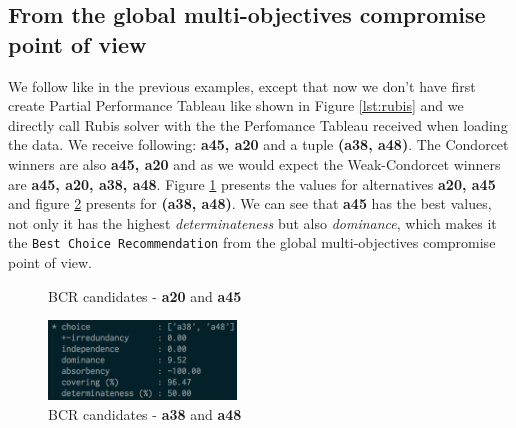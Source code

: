 \documentclass[a4paper]{article}
\begin{document}
\subsection{From the global multi-objectives compromise point of view}
\label{sec:global}

We follow like in the previous examples, except that now we don't have first create Partial Performance Tableau like shown in Figure \ref*{lst:rubis} and we directly call Rubis solver with the the Perfomance Tableau received when loading the data. We receive following: \textbf{a45, a20} and a tuple \textbf{(a38, a48)}. The Condorcet winners are also \textbf{a45, a20} and as we would expect the Weak-Condorcet winners are \textbf{a45, a20, a38, a48}. Figure \ref{fig:20and45} presents the values for alternatives \textbf{a20, a45} and figure \ref{fig:38_48} presents for \textbf{(a38, a48)}. We can see that \textbf{a45} has the best values, not only it has the highest \emph{determinateness} but also \emph{dominance}, which makes it the \texttt{Best Choice Recommendation} from the global multi-objectives compromise point of view.

\begin{figure}[H]
	\hfill
	\hfill
	\hfill
	\caption{BCR candidates - \textbf{a20} and \textbf{a45}}
	\label{fig:20and45}
\end{figure}

\begin{figure}[H]
	\centering
	\includegraphics[width=5cm]{figures/full_38_48}
	\caption{BCR candidates - \textbf{a38} and \textbf{a48}}
	\label{fig:38_48}
\end{figure}
\end{document}
